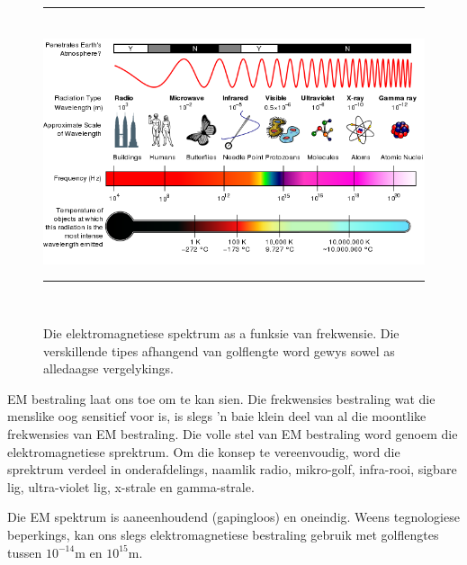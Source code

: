 	\begin{figure}[H] %
    \begin{center}
    \rule[.1in]{\figurerulewidth}{.005in} \\
        \label{m38778*uid3!!!underscore!!!media}\label{m38778*uid3!!!underscore!!!printimage}\includegraphics[width=\columnwidth]{col11305.imgs/m38778_EM_Spectrum_Properties_edit.png} %
      \label{fig:emspectrum}
      \caption{Die elektromagnetiese spektrum as a funksie van frekwensie. Die verskillende tipes afhangend van golflengte word gewys sowel as alledaagse vergelykings.
	}
    \vspace{.1in}
    \rule[.1in]{\figurerulewidth}{.005in} \\
    \end{center}
 \end{figure}       
      \label{m38778*id187230}EM bestraling laat ons toe om te kan sien. Die frekwensies bestraling wat die menslike oog sensitief voor is, is slegs 'n baie klein deel van al die moontlike frekwensies van EM bestraling. Die volle stel van EM bestraling word genoem die elektromagnetiese sprektrum. Om die konsep te vereenvoudig, word die sprektrum verdeel in onderafdelings, naamlik radio, mikro-golf, infra-rooi, sigbare lig, ultra-violet lig, x-strale en gamma-strale. \par 
      \label{m38778*eip-855}Die EM spektrum is aaneenhoudend (gapingloos) en oneindig. Weens tegnologiese beperkings, kan ons slegs elektromagnetiese bestraling gebruik met golflengtes tussen ${10}^{-14}\text{m}$ en ${10}^{15}\text{m}$.
\label{m38778*secfhsst!!!underscore!!!id117}
